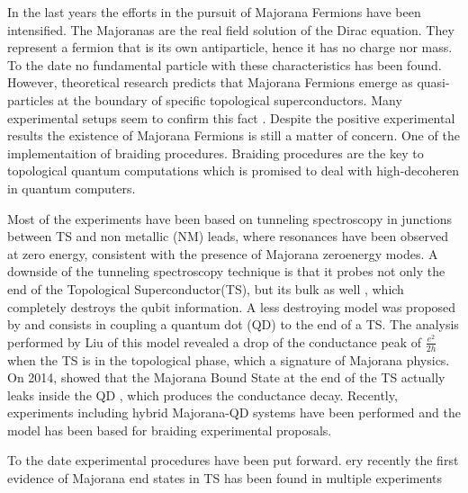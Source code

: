 \documentclass[showpacs,aps,prb,reprint,superscriptaddress]{revtex4-1}
\begin{document}
In the last years the efforts in the pursuit of Majorana Fermions\cite{Kitaev:P.U:2001} have been intensified. The Majoranas are the real field solution of the Dirac equation. They represent  a fermion that is its own antiparticle, hence it has no charge nor mass. To the date no fundamental particle with these characteristics has been found. However, theoretical research predicts that Majorana Fermions emerge as quasi-particles at the boundary of specific topological superconductors. Many experimental setups seem to confirm this fact  \citep{mourik_signatures_2012,das_zero-bias_2012,deng_anomalous_2012,zhang_quantized_2018}. Despite the positive experimental results the existence of  Majorana   Fermions is still a matter of concern. One of the implementaition of  braiding procedures. Braiding procedures are the key to topological quantum computations which is promised to deal with high-decoheren in quantum computers. 

Most of the experiments have been based on tunneling spectroscopy in junctions between TS and non metallic (NM) leads, where resonances have been observed at zero energy, consistent with the presence of Majorana zero\textendash energy modes. A downside of the tunneling spectroscopy technique  is that it probes not only the end of the Topological Superconductor(TS), but its bulk as well ,
which completely destroys the qubit information. A less destroying
model was proposed by  \citet{liu_detecting_2011} and consists in coupling a quantum dot (QD) to the end of a TS. The analysis performed by Liu of this model revealed a drop of the conductance peak of $\frac{e^{2}}{2h}$ when the TS is in the topological phase,  which a signature of
Majorana physics. On 2014, \citet{vernek_subtle_2014} showed that the Majorana Bound State at the end of the TS actually leaks inside the QD , which produces the conductance decay. Recently, experiments including hybrid Majorana-QD systems have been performed \cite{deng_majorana_2016} and the model has been based for braiding experimental proposals.










To the date experimental procedures have been put forward. ery recently the first evidence of Majorana end states
in TS has been found in multiple experiments
\end{document}

